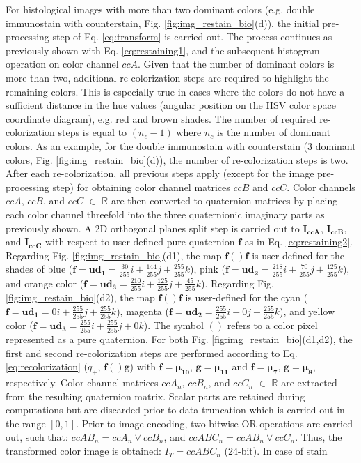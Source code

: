 \documentclass[superscriptaddress,longbibliography,aps,prl,twocolumn,10pt]{revtex4-2}
\begin{document}
For histological images with more than two dominant colors (e.g. double immunostain with counterstain, Fig. \ref{fig:img_restain_bio}(d)), the initial pre-processing step of Eq. \ref{eq:transform} is carried out. The process continues as previously shown with Eq. \ref{eq:restaining1}, and the subsequent histogram operation on color channel $ccA$. Given that the number of dominant colors is more than two, additional re-colorization steps are required to highlight the remaining colors. This is especially true in cases where the colors do not have a sufficient distance in the hue values (angular position on the HSV color space coordinate diagram), e.g. red and brown shades. The number of required re-colorization steps is equal to $(n_{c}-1)$ where $n_{c}$ is the number of dominant colors. As an example, for the double immunostain with counterstain (3 dominant colors, Fig. \ref{fig:img_restain_bio}(d)), the number of re-colorization steps is two. After each re-colorization, all previous steps apply (except for the image pre-processing step) for obtaining color channel matrices $ccB$ and $ccC$. Color channels $ccA$, $ccB$, and $ccC$ $\in$ $\mathbb{R}$ are then converted to quaternion matrices by placing each color channel threefold into the three quaternionic imaginary parts as previously shown. A 2D orthogonal planes split step is carried out to $\boldsymbol{I_{ccA}}$, $\boldsymbol{I_{ccB}}$, and $\boldsymbol{I_{ccC}}$ with respect to user-defined pure quaternion $\boldsymbol{f}$ as in Eq. \ref{eq:restaining2}. Regarding Fig. \ref{fig:img_restain_bio}(d1), the map $\boldsymbol{f}()\boldsymbol{f}$ is user-defined for the shades of blue ($\boldsymbol{f} = \boldsymbol{ud_{1}} = \frac{30}{255}i + \frac{144}{255}j + \frac{255}{255}k$), pink ($\boldsymbol{f} = \boldsymbol{ud_{2}} = \frac{218}{255}i + \frac{70}{255}j + \frac{125}{255}k$), and orange color ($\boldsymbol{f} = \boldsymbol{ud_{3}} = \frac{210}{255}i + \frac{125}{255}j + \frac{45}{255}k$). Regarding Fig. \ref{fig:img_restain_bio}(d2), the map $\boldsymbol{f}()\boldsymbol{f}$ is user-defined for the cyan ($\boldsymbol{f} = \boldsymbol{ud_{1}} = 0i + \frac{255}{255}j + \frac{255}{255}k$), magenta ($\boldsymbol{f} = \boldsymbol{ud_{2}} = \frac{255}{255}i + 0j + \frac{255}{255}k$), and yellow color ($\boldsymbol{f} = \boldsymbol{ud_{3}} = \frac{255}{255}i + \frac{255}{255}j + 0k$). The symbol $()$ refers to a color pixel represented as a pure quaternion. For both Fig. \ref{fig:img_restain_bio}(d1,d2), the first and second re-colorization steps are performed according to Eq. \ref{eq:recolorization} ($q_+$, $\boldsymbol{f}()\boldsymbol{g}$) with $\boldsymbol{f} = \boldsymbol{\mu_{10}}$, $\boldsymbol{g} = \boldsymbol{\mu_{11}}$ and $\boldsymbol{f} = \boldsymbol{\mu_{7}}$, $\boldsymbol{g} = \boldsymbol{\mu_{8}}$, respectively. Color channel matrices $ccA_{n}$, $ccB_{n}$, and $ccC_{n}$ $\in$ $\mathbb{R}$ are extracted from the resulting quaternion matrix. Scalar parts are retained during computations but are discarded prior to data truncation which is carried out in the range $[0,1]$. Prior to image encoding, two bitwise OR operations are carried out, such that: $ccAB_{n} = ccA_{n} \lor ccB_{n}$, and $ccABC_{n} = ccAB_{n} \lor ccC_{n}$. Thus, the transformed color image is obtained: $I_{T} = ccABC_{n}$ (24-bit). In case of stain 
\end{document}
